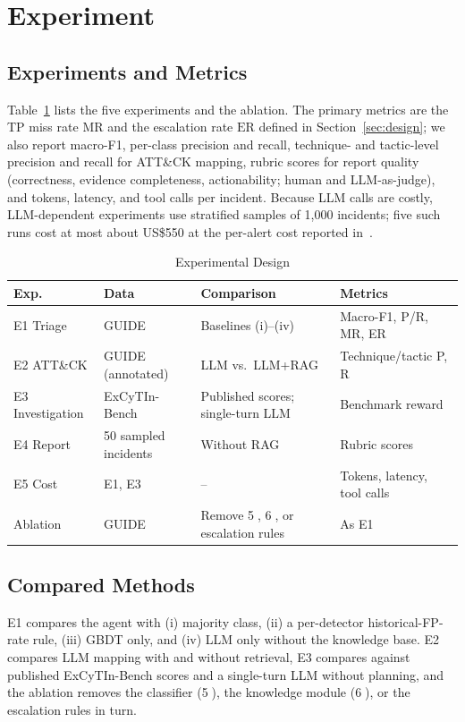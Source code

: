 \documentclass[conference]{IEEEtran}
\begin{document}
\section{Experiment}\label{sec:exp}

\subsection{Experiments and Metrics}
Table~\ref{tab:exp} lists the five experiments and the ablation. The
primary metrics are the TP miss rate $\mathrm{MR}$ and the escalation
rate $\mathrm{ER}$ defined in Section~\ref{sec:design}; we also report
macro-F1, per-class precision and recall, technique- and tactic-level
precision and recall for ATT\&CK mapping, rubric scores for report
quality (correctness, evidence completeness, actionability; human and
LLM-as-judge), and tokens, latency, and tool calls per incident.
Because LLM calls are costly, LLM-dependent experiments use stratified
samples of 1{,}000 incidents; five such runs cost at most about
US\$550 at the per-alert cost reported in~\cite{tsegai2026}.

\begin{table}[t]
\caption{Experimental Design}
\label{tab:exp}
\centering
\footnotesize
\setlength{\tabcolsep}{2.5pt}
\begin{tabular}{@{}p{1.3cm}p{1.6cm}p{2.2cm}p{2.6cm}@{}}
\toprule
\textbf{Exp.} & \textbf{Data} & \textbf{Comparison} & \textbf{Metrics} \\
\midrule
E1 Triage & GUIDE & Baselines (i)--(iv) & Macro-F1, P/R, MR, ER \\
E2 ATT\&CK & GUIDE (annotated) & LLM vs.\ LLM+RAG & Technique/tactic P, R \\
E3 Investigation & ExCyTIn-Bench & Published scores; single-turn LLM & Benchmark reward \\
E4 Report & 50 sampled incidents & Without RAG & Rubric scores \\
E5 Cost & E1, E3 & -- & Tokens, latency, tool calls \\
Ablation & GUIDE & Remove \textcircled{5}, \textcircled{6}, or escalation rules & As E1 \\
\bottomrule
\end{tabular}
\end{table}

\subsection{Compared Methods}
E1 compares the agent with (i) majority class, (ii) a per-detector
historical-FP-rate rule, (iii) GBDT only, and (iv) LLM only without the
knowledge base. E2 compares LLM mapping with and without retrieval, E3
compares against published ExCyTIn-Bench scores and a single-turn LLM
without planning, and the ablation removes the classifier
(\textcircled{5}), the knowledge module (\textcircled{6}), or the
escalation rules in turn.
\end{document}
